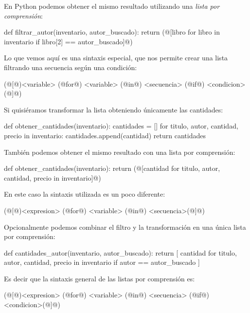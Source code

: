 \begin{subappendices}
En Python podemos obtener el mismo resultado utilizando una \emph{lista por
comprensión}:

\begin{codigo-python-sn}
def filtrar_autor(inventario, autor_buscado):
    return (@[libro for libro in inventario if libro[2] == autor_buscado]@)
\end{codigo-python-sn}

Lo que vemos aquí es una sintaxis especial, que nos permite crear una lista
filtrando una secuencia según una condición:

\begin{codigo-python-sn}
(@[@)<variable> (@for@) <variable> (@in@) <secuencia> (@if@) <condicion>(@]@)
\end{codigo-python-sn}

Si quisiéramos transformar la lista obteniendo únicamente las cantidades:

\begin{codigo-python-sn}
def obtener_cantidades(inventario):
    cantidades = []
    for titulo, autor, cantidad, precio in inventario:
        cantidades.append(cantidad)
    return cantidades
\end{codigo-python-sn}

También podemos obtener el mismo resultado con una lista por comprensión:

\begin{codigo-python-sn}
def obtener_cantidades(inventario):
    return (@[cantidad for titulo, autor, cantidad, precio in inventario]@)
\end{codigo-python-sn}

En este caso la sintaxis utilizada es un poco diferente:

\begin{codigo-python-sn}
(@[@)<expresion> (@for@) <variable> (@in@) <secuencia>(@]@)
\end{codigo-python-sn}

Opcionalmente podemos combinar el filtro y la transformación en una única lista
por comprensión:

\begin{codigo-python-sn}
def cantidades_autor(inventario, autor_buscado):
    return [
        cantidad
        for titulo, autor, cantidad, precio in inventario
        if autor == autor_buscado
    ]
\end{codigo-python-sn}

\begin{observacion}
Es decir que la sintaxis general de las listas por comprensión es:
\begin{codigo-python-sn}
(@[@)<expresion> (@for@) <variable> (@in@) <secuencia> (@if@) <condicion>(@]@)
\end{codigo-python-sn}
\end{observacion}


\end{subappendices}
